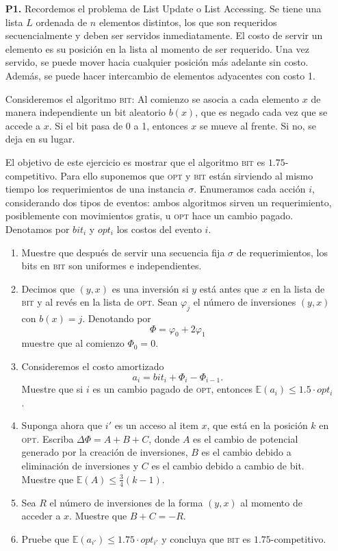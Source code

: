 \documentclass[11pt, spanish]{article}
\theoremstyle{plain}
\newcommand{\E}{\mathbb{E}}
\newcommand{\bit}{\textsc{bit}}
\newcommand{\opt}{\textsc{opt}}
\begin{document}
\begin{itemize}
\item[\textbf{P1.}] 
Recordemos el problema de List Update o List Accessing. Se tiene una lista $L$ ordenada de $n$ elementos distintos, los que son requeridos
secuencialmente y deben ser servidos inmediatamente. El costo de servir un elemento
es su posición en la lista al momento de ser
requerido. Una vez servido, se puede mover
hacia cualquier posición más adelante sin costo.
Además, se puede hacer intercambio de
elementos adyacentes con costo 1.

Consideremos el algoritmo \bit: Al comienzo
se asocia a cada elemento $x$ de manera
independiente un bit aleatorio
$b(x)$, que es negado cada vez que se accede
a $x$. Si el bit pasa de 0 a 1, entonces $x$
se mueve al frente. Si no, se deja en su lugar.

 El objetivo de este
ejercicio es mostrar que el algoritmo \bit{} es
$1.75$-competitivo. Para ello suponemos que
\opt{} y \bit{} están sirviendo al mismo tiempo
los requerimientos de una instancia $\sigma$.
Enumeramos cada acción $i$, considerando dos
tipos de eventos: ambos algoritmos sirven
un requerimiento, posiblemente con movimientos 
gratis, u \opt{} hace un cambio pagado.
Denotamos por $bit_i$ y $opt_i$ los costos
del evento $i$.

\begin{enumerate}
    \item Muestre que después de servir una secuencia fija
    $\sigma$ de requerimientos, los  bits en
    \bit{} son
    uniformes e independientes.
    
    \item Decimos que $(y,x)$ es una inversión
    si $y$ está antes que $x$ en la lista de
    \bit{}  y al revés en la lista de \opt. Sean
    $\varphi_j$ el número de inversiones
    $(y,x)$ con $b(x)=j$. Denotando por
    \[ \Phi = \varphi_0 + 2\varphi_1 \]
    muestre que al comienzo $\Phi_0=0$.
    
    \item Consideremos el costo amortizado
    \[ a_i = bit_i + \Phi_i - \Phi_{i-1}. \]
    Muestre que si $i$ es un cambio pagado
    de \opt, entonces $\E(a_i)\leq 1.5 \cdot opt_i$.
    
    \item Suponga ahora que $i'$ es un acceso
    al item $x$, que está en la posición $k$
    en \opt. Escriba $\Delta \Phi = A+B+C$, donde
    $A$ es el cambio de potencial generado
    por la creación de inversiones, $B$ es el
    cambio debido a eliminación de inversiones
    y $C$ es el cambio debido a cambio de bit.
    Muestre que $\E(A)\leq \frac{3}{4} (k-1)$.
    
    \item Sea $R$ el número de inversiones de la
    forma $(y,x)$ al momento de acceder a $x$.
    Muestre que $B+C=-R$.
    
    \item Pruebe que $\E(a_{i'}) \leq 1.75 \cdot opt_{i'}$ y concluya que \bit{} es $1.75$-competitivo.
\end{enumerate}

\end{itemize}
\end{document}
